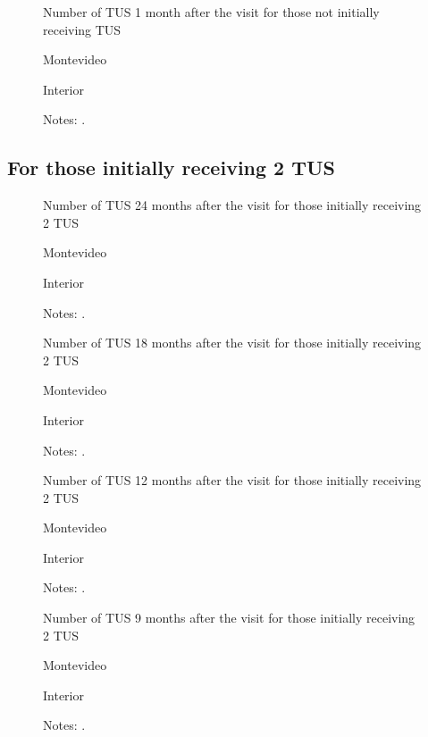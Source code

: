 \documentclass[12pt]{article}
\begin{document}
\begin{figure}[H]%
	\caption{Number of TUS 1 month after the visit for those not initially receiving TUS}%
	\centering
	\caption*{ {Montevideo}}
	\qquad
	\caption*{Interior}
	\label{fig:first_stage_si1Tus_tus1}%
	\caption*{ {\footnotesize Notes: .}}
\end{figure}

\subsection{For those initially receiving 2 TUS}

\begin{figure}[H]%
	\caption{Number of TUS 24 months after the visit for those initially receiving 2 TUS}%
	\centering
	\caption*{ {Montevideo}}
	\qquad
	\caption*{Interior}
	\label{fig:first_stage_si2Tus_tus24}%
	\caption*{ {\footnotesize Notes: .}}
\end{figure}

\begin{figure}[H]%
	\caption{Number of TUS 18 months after the visit for those initially receiving 2 TUS}%
	\centering
	\caption*{ {Montevideo}}
	\qquad
	\caption*{Interior}
	\label{fig:first_stage_si2Tus_tus18}%
	\caption*{ {\footnotesize Notes: .}}
\end{figure}

\begin{figure}[H]%
	\caption{Number of TUS 12 months after the visit for those initially receiving 2 TUS}%
	\centering
	\caption*{ {Montevideo}}
	\qquad
	\caption*{Interior}
	\label{fig:first_stage_si2Tus_tus12}%
	\caption*{ {\footnotesize Notes: .}}
\end{figure}

\begin{figure}[H]%
	\caption{Number of TUS 9 months after the visit for those initially receiving 2 TUS}%
	\centering
	\caption*{ {Montevideo}}
	\qquad
	\caption*{Interior}
	\label{fig:first_stage_si2Tus_tus9}%
	\caption*{ {\footnotesize Notes: .}}
\end{figure}
\end{document}
